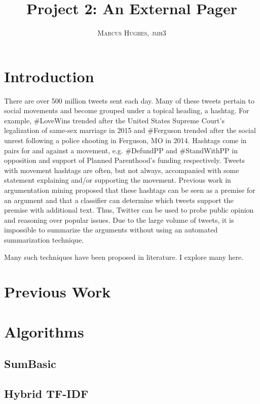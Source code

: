 \documentclass[paper=letter, fontsize=12pt]{article}
\title{\vspace{-15mm}\fontsize{24pt}{10pt}\selectfont\textbf{Project 2: An External Pager}} %
\author{
\large
{\textsc{Marcus Hughes, jmh3 }}\\[2mm]
}
\date{}
\begin{document}
\maketitle %
\thispagestyle{fancy} %


\begin{abstract}

\end{abstract}

\section{Introduction}
There are over 500 million tweets sent each day. Many of these tweets pertain to social movements and become grouped under a topical heading, a hashtag. For example, \#LoveWins trended after the United States Supreme Court's legalization of same-sex marriage in 2015 and \#Ferguson trended after the social unrest following a police shooting in Ferguson, MO in 2014. Hashtags come in pairs for and against a movement, e.g. \#DefundPP and \#StandWithPP in opposition and support of Planned Parenthood's funding respectively. Tweets with movement hashtags are often, but not always, accompanied with some statement explaining and/or supporting the movement. Previous work in argumentation mining proposed that these hashtags can be seen as a premise for an argument and that a classifier can determine which tweets support the premise with additional text. Thus, Twitter can be used to probe public opinion and reasoning over popular issues. Due to the large volume of tweets, it is impossible to summarize the arguments without using an automated summarization technique.

Many such techniques have been proposed in literature. I explore many here.

\section{Previous Work}

\section{Algorithms}
\subsection{SumBasic}
\subsection{Hybrid TF-IDF}
\end{document}
